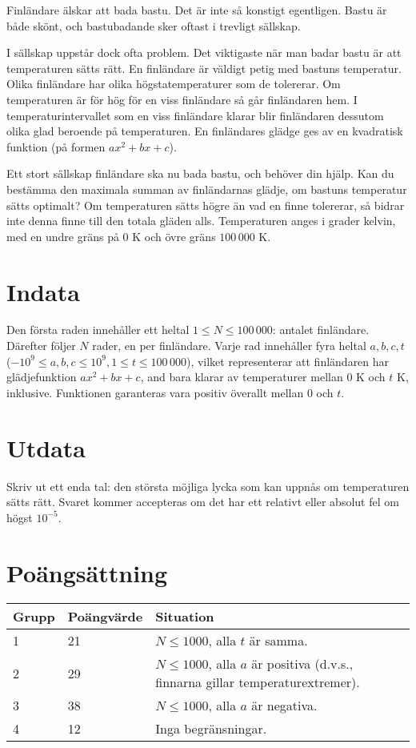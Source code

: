 Finländare älskar att bada bastu. Det är inte så konstigt egentligen.
Bastu är både skönt, och bastubadande sker oftast i trevligt sällskap.

I sällskap uppstår dock ofta problem. Det viktigaste när man badar bastu är att temperaturen sätts rätt.
En finländare är väldigt petig med bastuns temperatur.
Olika finländare har olika högstatemperaturer som de tolererar.
Om temperaturen är för hög för en viss finländare så går finländaren hem.
I temperaturintervallet som en viss finländare klarar blir finländaren dessutom olika glad beroende på temperaturen.
En finländares glädge ges av en kvadratisk funktion (på formen $ax^2 + bx + c$).

Ett stort sällskap finländare ska nu bada bastu, och behöver din hjälp.
Kan du bestämma den maximala summan av finländarnas glädje, om bastuns temperatur sätts optimalt?
Om temperaturen sätts högre än vad en finne tolererar, så bidrar inte denna finne till den totala gläden alls.
Temperaturen anges i grader kelvin, med en undre gräns på $0 \textrm{ K}$ och övre gräns $100\,000 \textrm{ K}$.

\section*{Indata}
Den första raden innehåller ett heltal $1 \le N \le 100\,000$: antalet finländare.
Därefter följer $N$ rader, en per finländare.
Varje rad innehåller fyra heltal $a, b, c, t$ ($-10^9 \le a,b,c \le 10^9, 1 \le t \le 100\,000$), vilket representerar att finländaren har glädjefunktion $ax^2 + bx + c$, and bara klarar av temperaturer mellan $0\textrm{ K}$ och $t\textrm{ K}$, inklusive.
Funktionen garanteras vara positiv överallt mellan $0$ och $t$.

\section*{Utdata}
Skriv ut ett enda tal: den största möjliga lycka som kan uppnås om temperaturen sätts rätt.
Svaret kommer accepteras om det har ett relativt eller absolut fel om högst $10^{-5}$.

\section*{Poängsättning}
\begin{tabular}{| l | l | l |}
\hline
Grupp & Poängvärde & Situation \\ \hline
1     & 21         & $N \le 1000$, alla $t$ är samma. \\ \hline
2     & 29         & $N \le 1000$, alla $a$ är positiva (d.v.s., finnarna gillar temperaturextremer). \\ \hline
3     & 38         & $N \le 1000$, alla $a$ är negativa. \\ \hline
4     & 12         & Inga begränsningar. \\ \hline
\end{tabular}
